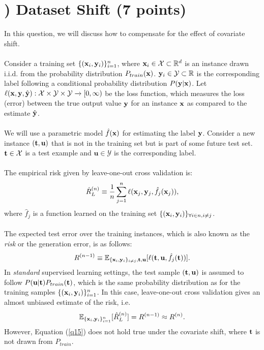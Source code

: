 \documentclass[11pt]{article}
\newcommand{\vx}{{\bf x}}
\newcommand{\vy}{{\bf y}}
\newcommand{\vt}{{\bf t}}
\renewcommand{\vec}[1]{\mathbf{#1}}
\newcounter{QuestionCounter}
\begin{document}
\section*{) 
Dataset Shift (7 points)} 
In this question, we will discuss how to compensate for the effect of covariate shift.
\\\\
Consider a training set $\{(\vx_i, \vy_i )\}^n_{i=1}$, where $\vx_i\in\mathcal{X}\subset \mathbb{R}^d$ is an instance drawn i.i.d. from the probability distribution $P_{train}(\vx)$. $\vy_i\in\mathcal{Y}\subset \mathbb{R}$ is the corresponding label following a conditional probability distribution $P(\vy|\vx)$. Let $\ell(\vx, \vy, \hat{\vy}): \mathcal{X} \times \mathcal{Y} \times \mathcal{Y} \xrightarrow[]{} [0, \infty)$ be the loss function, which measures the loss (error) between the true output value $\vy$ for an instance $\vx$ as compared to the estimate $\hat{\vy}$.
\\\\
We will use a parametric model $\hat{f}(\vx)$ for estimating the label $\vy$. Consider a new instance $(\vt, \vec{u})$ that is not in the training set but is part of some future test set. $\vt \in \mathcal{X}$ is a test example and $\vec{u}\in\mathcal{Y}$ is the corresponding label. \\\\
The empirical risk given by leave-one-out cross validation is:
\begin{equation}\label{eq13}
    \hat{R}^{(n)}_L \equiv \frac{1}{n}\sum_{j=1}^n\ell(\vx_j, \vy_j, \hat{f}_j(\vx_j)),
\end{equation}
where $\hat{f}_j$ is a function learned on the training set $\{(\vx_i, \vy_i)\}_{\forall i \in n, i\neq j}$.\\\\
The expected test error over the training instances, which is also known as the \textit{risk} or the generation error, is as follows:
\begin{equation}\label{q14}
    R^{(n-1)} \equiv \mathbb{E}_{\{\vx_i, \vy_i\}_{i\neq j}, \vt, \vec{u}} [\ell(\vt, \vec{u}, \hat{f}_j(\vt))].
\end{equation}
In \textit{standard} supervised learning settings, the test sample $(\vt, \vec{u})$ is assumed to follow $P(\vec{u}|\vt)P_{train}(\vt)$, which is the same probability distribution as for the training samples $\{(\vx_i,\vy_i)\}^n_{i=1}$. In this case, leave-one-out cross validation gives an almost unbiased estimate of the risk, i.e.
\begin{equation}\label{q15}
    \mathbb{E}_{\{\vx_i, \vy_i\}^n_{i=1}}[\hat{R}^{(n)}_L] = R^{(n-1)} \approx R^{(n)}.
\end{equation}
However, Equation (\ref{q15}) does not hold true under the covariate shift, where $\vt$ is not drawn from $P_{train}$.
\end{document}
